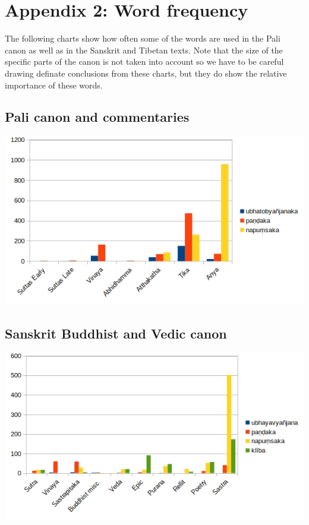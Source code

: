 \section{Appendix 2: Word frequency}
\label{appendix2}

The following charts show how often some of the words are used in the Pali canon as well as in the Sanskrit and Tibetan texts. Note that the size of the specific parts of the canon is not taken into account so we have to be careful drawing definate conclusions from these charts, but they do show the relative importance of these words. 

\subsection{Pali canon and commentaries}

\includegraphics[width=\linewidth]{pali.jpg}
\label{pali1}

\subsection{Sanskrit Buddhist and Vedic canon}

\includegraphics[width=\linewidth]{sanskrit.jpg}
\label{sanskrit1}

